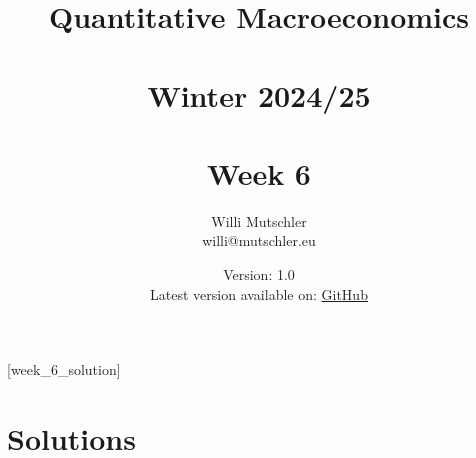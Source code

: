 
\newif\ifDisplaySolutions\DisplaySolutionstrue%


\title{Quantitative Macroeconomics\\~\\Winter 2024/25\\~\\Week 6}
\author{Willi Mutschler\\willi@mutschler.eu}
\date{Version: 1.0\\Latest version available on: \href{https://github.com/wmutschl/Quantitative-Macroeconomics/releases/latest/download/week_6.pdf}{GitHub}}
\maketitle\thispagestyle{empty}

\newpage
{}[week_6_solution]
\tableofcontents\thispagestyle{empty}\newpage

\setcounter{page}{1}
\newpage
\newpage
\newpage
\newpage
\newpage
\printbibliography%
\newpage

\ifDisplaySolutions%
\newpage
\appendix
\section{Solutions}

\fi

